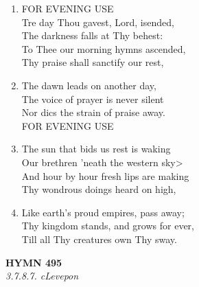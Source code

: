 \documentclass[11pt,a4paper]{article}
\begin{document}
\begin{enumerate}
    \item FOR EVENING USE \\
        Tre day Thou gavest, Lord, isended, \\
        The darkness falls at Thy behest: \\
        To Thee our morning hymns ascended, \\
        Thy praise shall sanctify our rest,

    \item The dawn leads on another day, \\
        The voice of prayer is never silent \\
        Nor dics the strain of praise away. \\
        FOR EVENING USE

    \item The sun that bids us rest is waking \\
        Our brethren 'neath the western sky> \\
        And hour by hour fresh lips are making \\
        Thy wondrous doings heard on high,

    \item Like earth's proud empires, pass away; \\
        Thy kingdom stands, and grows for ever, \\
        Till all Thy creatures own Thy sway.

\end{enumerate}

\newpage
\begin{center}
    {\Large \textbf{HYMN 495}}
    \\
    \textit{3.7.8.7. cLevepon}
\end{center}
\vspace{1em}
\end{document}
